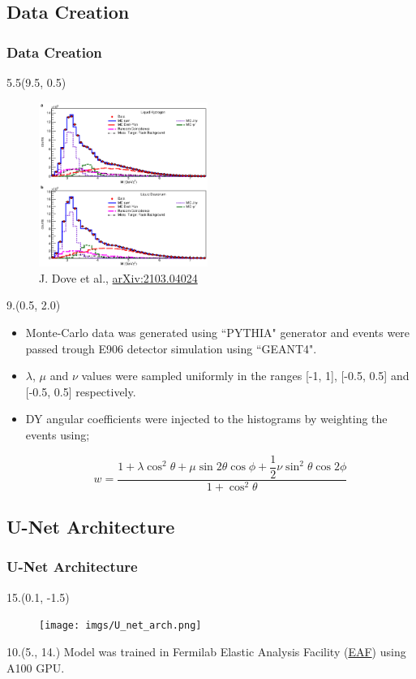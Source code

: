 \documentclass[12pt, xcolor={dvipsnames}, aspectratio = 169, sans, mathserif]{beamer}
\newenvironment{List}[2]
{\begin{textblock}{#1}#2
\begin{itemize}}
{\end{itemize}
\end{textblock}}
\newenvironment{Pic}[2]
{\begin{textblock}{#1}#2
\begin{figure}}
{\end{figure}
\end{textblock}}
\newcommand{\NewCaption}[3]{\caption{{#1}, \textcolor{blue}{\href{#2}{#3}}}}
\begin{document}
\subsection{Data Creation}
\begin{frame}
\frametitle{Data Creation}

\begin{Pic}{5.5}{(9.5, 0.5)}
  \NewCaption{J. Dove et al.}{https://arxiv.org/abs/2103.04024}{arXiv:2103.04024}
  \includegraphics[width=5.5cm]{imgs/mc2real.png}
\end{Pic}

\begin{List}{9.}{(0.5, 2.0)}

  \item Monte-Carlo data was generated using ``PYTHIA" generator and events were passed trough E906 detector simulation using ``GEANT4".

  \item $\lambda$, $\mu$ and $\nu$ values were sampled uniformly in the ranges [-1, 1], [-0.5, 0.5] and [-0.5, 0.5] respectively.

  \item DY angular coefficients were injected to the histograms by weighting the events using;

  \begin{equation*}
w = \frac{1  + \lambda \cos^{2}\theta + \mu \sin 2 \theta \cos \phi + \dfrac{1}{2}\nu \sin^{2}\theta \cos 2 \phi}{1 + \cos^{2}\theta}
  \end{equation*}

\end{List}
\end{frame}

\subsection{U-Net Architecture}

\begin{frame}
\frametitle{U-Net Architecture}

\begin{Pic}{15.}{(0.1, -1.5)}
  \texttt{[image: imgs/U\_net\_arch.png]}
\end{Pic}

\begin{textblock}{10.}(5., 14.)
Model was trained in  Fermilab Elastic Analysis Facility (\textcolor{blue}{\href{https://eafjupyter.readthedocs.io/en/latest/index.html}{EAF}}) using A100 GPU.
\end{textblock}

\end{frame}
\end{document}
